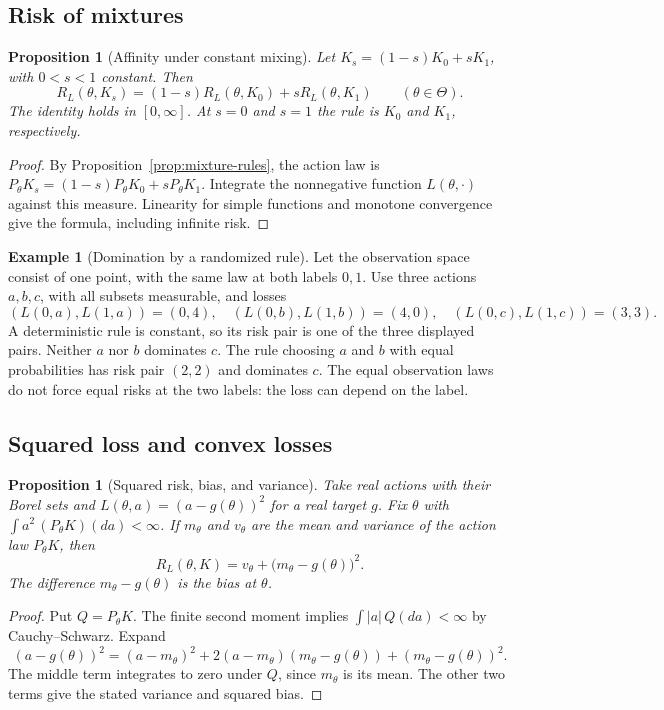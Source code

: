 \documentclass[11pt,oneside]{book}
\newtheorem{proposition}[theorem]{Proposition}
\theoremstyle{definition}
\newtheorem{example}[theorem]{Example}
\theoremstyle{remark}
\begin{document}
\subsection{Risk of mixtures}
\label{subsec:risk-mixtures}

\begin{proposition}[Affinity under constant mixing]
\label{prop:affine-risk}
Let $K_s=(1-s)K_0+sK_1$, with $0<s<1$ constant. Then
\[
R_L(\theta,K_s)=(1-s)R_L(\theta,K_0)+sR_L(\theta,K_1)
\qquad(\theta\in\Theta).
\]
The identity holds in $[0,\infty]$. At $s=0$ and $s=1$ the rule is
$K_0$ and $K_1$, respectively.
\end{proposition}
\begin{proof}
By Proposition~\ref{prop:mixture-rules}, the action law is
$P_\theta K_s=(1-s)P_\theta K_0+sP_\theta K_1$. Integrate the nonnegative
function $L(\theta,\cdot)$ against this measure. Linearity for simple
functions and monotone convergence give the formula, including infinite
risk.
\end{proof}

\begin{example}[Domination by a randomized rule]
\label{ex:randomized-domination}
Let the observation space consist of one point, with the same law at
both labels $0,1$. Use three actions $a,b,c$, with all subsets measurable,
and losses
\[
(L(0,a),L(1,a))=(0,4),\quad
(L(0,b),L(1,b))=(4,0),\quad
(L(0,c),L(1,c))=(3,3).
\]
A deterministic rule is constant, so its risk pair is one of the three
displayed pairs. Neither $a$ nor $b$ dominates $c$. The rule choosing
$a$ and $b$ with equal probabilities has risk pair $(2,2)$ and dominates
$c$. The equal observation laws do not force equal risks at the two
labels: the loss can depend on the label.
\end{example}

\subsection{Squared loss and convex losses}
\label{subsec:risk-convex}

\begin{proposition}[Squared risk, bias, and variance]
\label{prop:bias-variance-risk}
Take real actions with their Borel sets and $L(\theta,a)=(a-g(\theta))^2$
for a real target $g$. Fix $\theta$ with
$\int a^2\,(P_\theta K)(da)<\infty$. If $m_\theta$ and $v_\theta$ are the
mean and variance of the action law $P_\theta K$, then
\[
R_L(\theta,K)=v_\theta+\bigl(m_\theta-g(\theta)\bigr)^2.
\]
The difference $m_\theta-g(\theta)$ is the \emph{bias} at $\theta$.
\end{proposition}
\begin{proof}
Put $Q=P_\theta K$. The finite second moment implies
$\int |a|\,Q(da)<\infty$ by Cauchy--Schwarz. Expand
\[
(a-g(\theta))^2
=(a-m_\theta)^2+2(a-m_\theta)(m_\theta-g(\theta))
 +(m_\theta-g(\theta))^2.
\]
The middle term integrates to zero under $Q$, since $m_\theta$ is its
mean. The other two terms give the stated variance and squared bias.
\end{proof}
\end{document}
